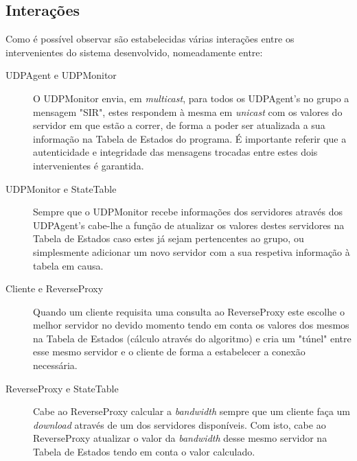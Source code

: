 \documentclass{article}
\begin{document}
\subsection{Interações}
Como é possível observar são estabelecidas várias interações entre os intervenientes do sistema desenvolvido, nomeadamente entre:
\begin{description}
    \item [UDPAgent e UDPMonitor] O UDPMonitor envia, em \textit{multicast}, para todos os UDPAgent's no grupo a mensagem "SIR", estes respondem à mesma em \textit{unicast} com os valores do servidor em que estão a correr, de forma a poder ser atualizada a sua informação na Tabela de Estados do programa. É importante referir que a autenticidade e integridade das mensagens trocadas entre estes dois intervenientes é garantida.
    \item [UDPMonitor e StateTable] Sempre que o UDPMonitor recebe informações dos servidores através dos UDPAgent's cabe-lhe a função de atualizar os valores destes servidores na Tabela de Estados caso estes já sejam pertencentes ao grupo, ou simplesmente adicionar um novo servidor com a sua respetiva informação 
à tabela em causa.
    \item [Cliente e ReverseProxy] Quando um cliente requisita uma consulta ao ReverseProxy este escolhe o melhor servidor no devido momento tendo em conta os valores dos mesmos na Tabela de Estados (cálculo através do algoritmo) e cria um "túnel" entre esse mesmo servidor e o cliente de forma a estabelecer a conexão necessária.
    \item [ReverseProxy e StateTable] Cabe ao ReverseProxy calcular a \textit{bandwidth} sempre que um cliente faça um \textit{download} através de um dos servidores disponíveis. Com isto, cabe ao ReverseProxy atualizar o valor da \textit{bandwidth} desse mesmo servidor na Tabela de Estados tendo em conta o valor calculado.
\end{description}
\end{document}
